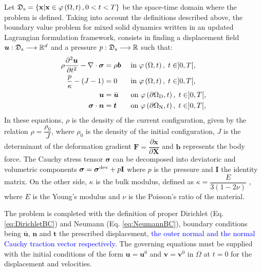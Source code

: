 \documentclass[11pt,english]{article}
\newcommand{\LM}[1]{\textcolor{blue}{#1}}
\def\InitialDomain{\Omega}
\def\disp{\boldsymbol{u}}
\def\stress{\boldsymbol{\sigma}}
\def\stressdev{\boldsymbol{\sigma}^{\rm{dev}}}
\def\Identity{\mathbf{I}}
\def\t{\boldsymbol{t}}
\def\temp{\dfrac{\partial^2 \disp}{\partial t^2}}
\begin{document}
 Let $\mathfrak{D}_{\rm{s}} =\{\mathbf{x}\vert\mathbf{x} \in\varphi \left( \InitialDomain,t\right), 0<t<T\}$ be the space-time domain where the problem is defined.   Taking into account the definitions described above, the boundary value problem for mixed solid dynamics written in an updated Lagrangian formulation framework, consists in finding a displacement field $\disp:\mathfrak{D}_{\rm{s}}\longrightarrow {\mathbb R}^d$ and a pressure $p:\mathfrak{D}_{\rm{s}}\longrightarrow {\mathbb R}$ such that:
    \begin{align}
        \rho \temp-\nabla \cdot \stress  &= \rho \boldsymbol{b} && \text{ in } \varphi \left( \InitialDomain,t \right), \; t\in]0,T[, \label{eq:momentum}\\
        \dfrac{p}{\kappa}-(J-1) &=0 && \text{ in } \varphi \left( \InitialDomain, t\right), \; t\in]0,T[, \label{eq:mass}\\
        \disp &=\bar{\disp} && \text{ on } \varphi \left( \partial \Omega_{\rm{D}},t \right), \; t\in]0,T[,\label{eq:DirichletBC}\\
        \stress \cdot \boldsymbol{n} &= \t && \text{ on } \varphi \left( \partial \Omega_{\rm{N}},t \right), \; t\in]0,T[, \label{eq:NeumannBC}
    \end{align}
   In these equations, $\rho$ is the density of the current configuration, given by the relation $\rho=\displaystyle{\dfrac{\rho_0}{J}}$, where $\rho_0$ is the density of the initial configuration, $J$ is the determinant of the deformation gradient $\mathbf{F} = \dfrac{\partial \mathbf{x}}{\partial\mathbf{X}}$ and $\boldsymbol{b}$ represents the body force.
   The Cauchy stress tensor $\stress$ can be decomposed into deviatoric and volumetric components $\stress=\stressdev+p\Identity$ where $p$ is the pressure and $\Identity$ the identity matrix. 
   On the other side, $\kappa$ is the bulk modulus, defined as $\kappa=\displaystyle{\dfrac{E}{3(1-2{\nu})}}$
   , where $E$ is  the Young's modulus and $\nu$ is the Poisson's ratio of the material.
   
The problem is completed with the definition of proper Dirichlet (Eq. \ref{eq:DirichletBC}) and Neumann (Eq. \ref{eq:NeumannBC}),  boundary conditions being $\bar{\boldsymbol{u}}$, $\boldsymbol{n}$ and $\t$ the prescribed displacement, \LM{the outer normal and the normal Cauchy traction vector respectively}.
 The governing equations must be supplied with the initial conditions of the form $\disp = \disp^{0}$ and $\boldsymbol{v} = \boldsymbol{v}^{0}$  in $\InitialDomain$ at $t=0$ for the displacement and velocities.
   
\end{document}
